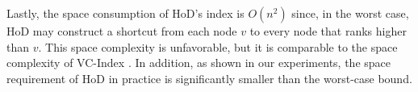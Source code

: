 \documentclass{sig-alternate}
\def\figcapup{\vspace{-2mm}}
\def\figcapdown{\vspace{-3mm}}
\begin{document}
\begin{sloppy}
Lastly, the space consumption of HoD's index is $O(n^2)$ since, in the worst case, HoD may construct a shortcut from each node $v$ to every node that ranks higher than $v$. This space complexity is unfavorable, but it is comparable to the space complexity of VC-Index \cite{ckcc12}. In addition, as shown in our experiments, the space requirement of HoD in practice is significantly smaller than the worst-case bound.








\end{sloppy}
\end{document}

